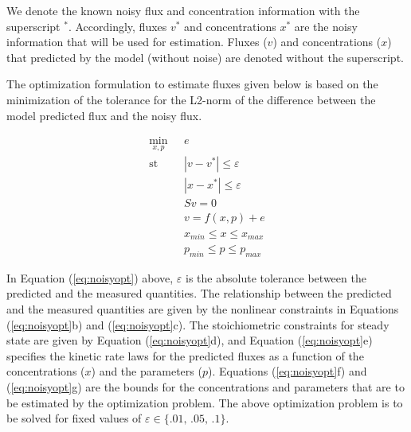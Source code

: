 \documentclass[10pt]{report}
\begin{document}
	We denote the known noisy flux and concentration information with the superscript $^*$. Accordingly, fluxes $v^*$ and concentrations $x^*$ are the noisy information that will be used for estimation. Fluxes ($v$) and concentrations ($x$) that predicted by the model (without noise) are denoted without the superscript.
	
	The optimization formulation to estimate fluxes given below is based on the minimization of the tolerance for the L2-norm of the difference between the model predicted flux and the noisy flux. 
	\begin{center}
		\begin{subequations}\label{eq:noisyopt}
			\begin{align}
			\underset{x,p}{\mathrm{min}} & \text{      }e\\
			\mathrm{st} & \text{      }|v-v^*| \le \varepsilon\\
			& \text{      }|x-x^*| \le \varepsilon\\
			& \text{      }Sv = 0\\
			& \text{      }v = f(x,p) + e\\
			& \text{      }x_{min}\le x \le x_{max}\\
			& \text{      }p_{min} \le p \le p_{max}			
			\end{align}
		\end{subequations}		
	\end{center}

	In Equation (\ref{eq:noisyopt}) above, $\varepsilon$ is the absolute tolerance between the predicted and the measured quantities. The relationship between the predicted and the measured quantities are given by the nonlinear constraints in Equations (\ref{eq:noisyopt}b) and (\ref{eq:noisyopt}c). The stoichiometric constraints for steady state are given by Equation (\ref{eq:noisyopt}d), and Equation (\ref{eq:noisyopt}e) specifies the kinetic rate laws for the predicted fluxes as a function of the concentrations ($x$) and the parameters ($p$). Equations (\ref{eq:noisyopt}f) and (\ref{eq:noisyopt}g) are the bounds for the concentrations and parameters that are to be estimated by the optimization problem. The above optimization problem is to be solved for fixed values of $\varepsilon \in \{\text{.01, .05, .1}\}$.	
	
\end{document}
